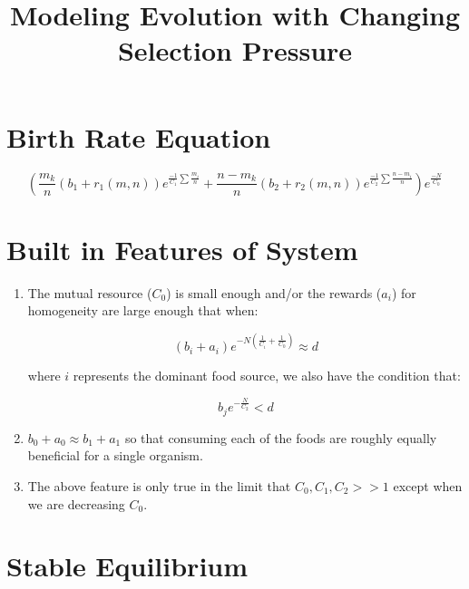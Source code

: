 \documentclass[11pt]{article}
\title{Modeling Evolution with Changing Selection Pressure}
\author{\Name}
\date{}
\begin{document}
\maketitle

\section*{Birth Rate Equation}

	\begin{equation*}
			(\frac{m_k}{n}(b_1 + r_1(m,n))e^{\frac{-1}{C_1}\sum{\frac{m_i}{n}}} + \frac{n - m_k}{n}(b_2 + r_2(m,n))e^{\frac{-1}{C_2}\sum{\frac{n - m_i}{n}}})e^{\frac{-N}{C_0}}
		\end{equation*}
		
\section*{Built in Features of System}

\begin{enumerate}

	\item
	The mutual resource ($C_0$) is small enough and/or the rewards ($a_i$) for homogeneity are large enough that when:
	
	\begin{equation} \label{eq:1}
		(b_i + a_i)e^{-N(\frac{1}{C_i} + \frac{1}{C_0})} \approx d
	\end{equation}
	
	where $i$ represents the dominant food source, we also have the condition that:
	
	\begin{equation*}
		b_je^{-\frac{N}{C_2}} < d
	\end{equation*}
	
	\item
	$b_0 + a_0 \approx b_1 + a_1$ so that consuming each of the foods are roughly equally beneficial for a single organism.
	
	\item
	The above feature is only true in the limit that $C_0,C_1,C_2 >> 1$ except when we are decreasing $C_0$.
	
\end{enumerate}
	
	

\section*{Stable Equilibrium}
\end{document}

